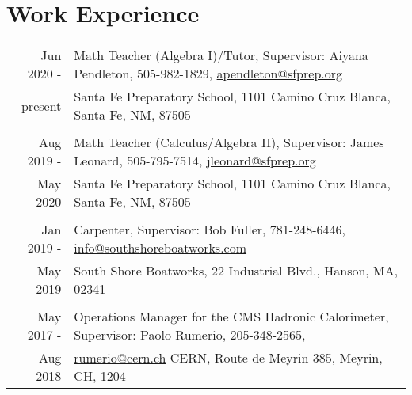 \documentclass[10pt]{article} %
\begin{document}
\section{Work Experience}

\begin{tabulary}{\textwidth}{RL}	

Jun 2020 - & Math Teacher (Algebra I)/Tutor, Supervisor: Aiyana Pendleton, 505-982-1829, \href{mailto:apendleton@sfprep.org}{apendleton@sfprep.org}  \\
 present    &  Santa Fe Preparatory School, 1101 Camino Cruz Blanca, Santa Fe, NM, 87505 \\ 
%
\vspace{5pt} \\

Aug 2019 -     & Math Teacher (Calculus/Algebra II), Supervisor: James Leonard, 505-795-7514, \href{mailto:jleonard@sfprep.org}{jleonard@sfprep.org} \\
 May 2020       & Santa Fe Preparatory School, 1101 Camino Cruz Blanca, Santa Fe, NM, 87505 \\ %

\vspace{5pt} \\

Jan 2019 -     & Carpenter, Supervisor: Bob Fuller, 781-248-6446, \href{mailto:info@southshoreboatworks.com}{info@southshoreboatworks.com} \\
 May 2019      & South Shore Boatworks, 22 Industrial Blvd., Hanson, MA, 02341 \\ %

\vspace{5pt} \\

May 2017 -     & Operations Manager for the CMS Hadronic Calorimeter, Supervisor: Paolo Rumerio, 205-348-2565, \\
 Aug 2018      & \href{mailto:rumerio@cern.ch}{rumerio@cern.ch} CERN, Route de Meyrin 385, Meyrin, CH, 1204 \\ %


\end{tabulary}
\end{document}
